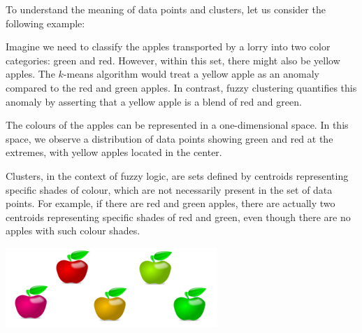 \begin{exempli_gratia}
To understand the meaning of data points and clusters, let us consider the following example:

\noindent Imagine we need to classify the apples transported by a lorry into two color categories: green and red. However, within this set, there might also be yellow apples. The $k$-means algorithm would treat a yellow apple as an anomaly compared to the red and green apples. In contrast, fuzzy clustering quantifies this anomaly by asserting that a yellow apple is a blend of red and green.

\noindent The colours of the apples can be represented in a one-dimensional space. In this space, we observe a distribution of data points showing green and red at the extremes, with yellow apples located in the center.

\noindent Clusters, in the context of fuzzy logic, are sets defined by centroids representing specific shades of colour, which are not necessarily present in the set of data points. For example, if there are red and green apples, there are actually two centroids representing specific shades of red and green, even though there are no apples with such colour shades.

\begin{center}
	\includegraphics[width=0.5\linewidth]{Figures/apple.png}
\end{center}
\end{exempli_gratia}

